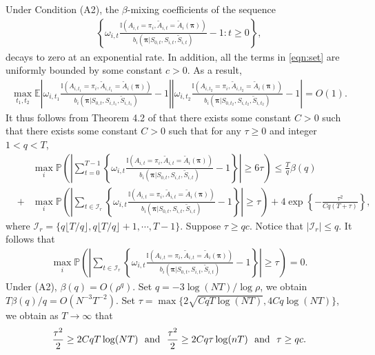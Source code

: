 \documentclass{article}
\newcommand{\Mean}{{\mathbb{E}}}
\newcommand{\prob}{{\mathbb{P}}}
\def\floor#1{\lfloor #1 \rfloor}
\begin{document}
Under Condition (A2), the $\beta$-mixing coefficients of the sequence
\begin{eqnarray}\label{eqn:set}
	\left\{\omega_{i,t}\frac{\mathbb{I}(A_{i,t}=\pi_i,\widetilde{A}_{i,t}=\widetilde{A}_i(\bm{\pi}))}{b_i(\bm{\pi}|S_{0,t},S_{i,t},\widetilde{S}_{i,t})}-1:t\ge 0\right\},
\end{eqnarray}
decays to zero at an exponential rate. In addition, all the terms in \eqref{eqn:set} are uniformly bounded by some constant $c>0$. As a result, 
\begin{eqnarray*}
	\max_{t_1,t_2}\Mean \left|\omega_{i,t_1}\frac{\mathbb{I}(A_{i,t_1}=\pi_i,\widetilde{A}_{i,t_1}=\widetilde{A}_i(\bm{\pi}))}{b_i(\bm{\pi}|S_{0,t},S_{i,t_1},\widetilde{S}_{i,t_1})}-1\right|\left|\omega_{i,t_2}\frac{\mathbb{I}(A_{i,t_2}=\pi_i,\widetilde{A}_{i,t_2}=\widetilde{A}_i(\bm{\pi}))}{b_i(\bm{\pi}|S_{0,t_2},S_{i,t_2},\widetilde{S}_{i,t_2})}-1\right|=O(1).
\end{eqnarray*}
It thus follows from Theorem 4.2 of \cite{Chen2015} that there exists some constant $C>0$ such that
there exists some constant $C>0$ such that for any $\tau\ge 0$ and integer $1<q<T$,
\begin{eqnarray}\nonumber
&&\max_i \prob\left(\left|\sum_{t=0}^{T-1} \left\{\omega_{i,t}\frac{\mathbb{I}(A_{i,t}=\pi_i,\widetilde{A}_{i,t}=\widetilde{A}_i(\bm{\pi}))}{b_i(\bm{\pi}|S_{0,t},S_{i,t},\widetilde{S}_{i,t})}-1\right\} \right|\ge 6\tau \right)\le \frac{T}{q}\beta(q)\\\label{prooflemma3eq8}
&+&\max_i \prob\left( \left|\sum_{t\in \mathcal{I}_r} \left\{\omega_{i,t}\frac{\mathbb{I}(A_{i,t}=\pi_i,\widetilde{A}_{i,t}=\widetilde{A}_i(\bm{\pi}))}{b_i(\bm{\pi}|S_{0,t},S_{i,t},\widetilde{S}_{i,t})}-1\right\}\right|\ge \tau \right)
+4 \exp\left\{-\frac{\tau^2}{Cq(T+\tau)} \right\},
\end{eqnarray}
where $\mathcal{I}_r=\{q\floor{T/q},q\floor{T/q} +1, \cdots,T-1\}$. Suppose $\tau\ge qc$. Notice that $|\mathcal{I}_r|\le q$. It follows that
\begin{eqnarray}\label{prooflemma3eq8.5}
\max_i \prob\left( \left|\sum_{t\in \mathcal{I}_r} \left\{\omega_{i,t}\frac{\mathbb{I}(A_{i,t}=\pi_i,\widetilde{A}_{i,t}=\widetilde{A}_i(\bm{\pi}))}{b_i(\bm{\pi}|S_{0,t},S_{i,t},\widetilde{S}_{i,t})}-1\right\}\right|\ge \tau \right)=0.
\end{eqnarray}
Under (A2), $\beta(q)=O(\rho^q)$. Set $q=-3\log (NT)/\log \rho$, we obtain $T\beta(q)/q=O(N^{-3} T^{-2})$. Set $\tau=\max\{2\sqrt{CqT\log (NT)}, 4Cq\log(NT)\}$, we obtain as $T\to \infty$ that
\begin{eqnarray*}
	\frac{\tau^2}{2}\ge 2CqT\log (NT)\,\,\,\,\hbox{and}\,\,\,\,\frac{\tau^2}{2}\ge 2Cq\tau \log (nT)\,\,\,\,\hbox{and}\,\,\,\,\tau \ge qc.
\end{eqnarray*} 
\end{document}
